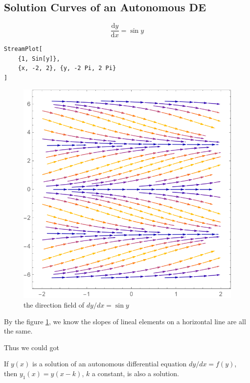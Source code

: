 \subsection{Solution Curves of an Autonomous DE}

\begin{example}
    \[
        \dfrac{\mathrm{d}y}{\mathrm{d}x} = \sin y
    \]

    \begin{verbatim}
StreamPlot[
    {1, Sin[y]}, 
    {x, -2, 2}, {y, -2 Pi, 2 Pi}
]
    \end{verbatim}
    \begin{figure}[H]
        \centering
        \includegraphics[width = \textwidth]{figure/direction-field-dy-slash-dx-siny}
        \caption{the direction field of $dy/dx = \sin y$}
        \label{fig:direction-field-dy-slash-dx-siny}
    \end{figure}
\end{example}

By the figure \ref{fig:direction-field-dy-slash-dx-siny}, we know
the slopes of lineal elements on a horizontal line are all the same.

Thus we could got 
\begin{corollary}
    If $y(x)$ is a solution of an autonomous differential equation
    $dy/dx = f(y)$, then $y_1(x) = y(x - k)$, $k$ a constant,
    is also a solution.
\end{corollary}


